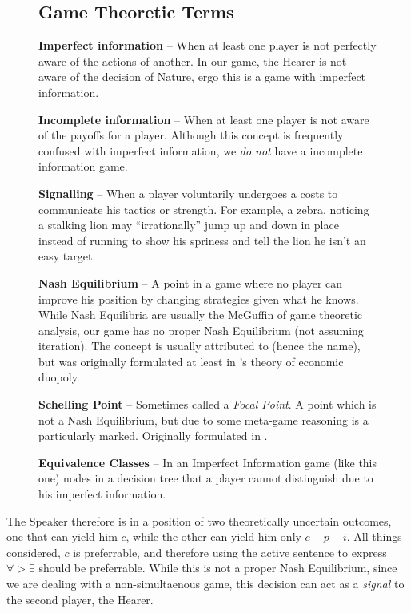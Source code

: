 \documentclass{article}
\begin{document}
\begin{figure}
\begin{shaded}
	\small
	\subsection*{Game Theoretic Terms}

	\textbf{Imperfect information} -- When at least one player is not perfectly aware of the actions of another. In our game, the Hearer is not aware of the decision of Nature, ergo this is a game with imperfect information.

	\textbf{Incomplete information} -- When at least one player is not aware of the payoffs for a player. Although this concept is frequently confused with imperfect information, we \emph{do not} have a incomplete information game.

	\textbf{Signalling} -- When a player voluntarily undergoes a costs to communicate his tactics or strength. For example, a zebra, noticing a stalking lion may ``irrationally'' jump up and down in place instead of running to show his spriness and tell the lion he isn't an easy target.

	\textbf{Nash Equilibrium} -- A point in a game where no player can improve his position by changing strategies given what he knows. While Nash Equilibria are usually the McGuffin of game theoretic analysis, our game has no proper Nash Equilibrium (not assuming iteration). The concept is usually attributed to \textcite{nash50} (hence the name), but was originally formulated at least in \textcite{cournot38}'s theory of economic duopoly.

	\textbf{Schelling Point} -- Sometimes called a \textit{Focal Point}. A point which is not a Nash Equilibrium, but due to some meta-game reasoning is a particularly marked. Originally formulated in \textcite{schelling60}.

	\textbf{Equivalence Classes} -- In an Imperfect Information game (like this one) nodes in a decision tree that a player cannot distinguish due to his imperfect information.
\end{shaded}
\end{figure}

The Speaker therefore is in a position of two theoretically uncertain outcomes, one that can yield him $c$, while the other can yield him only $c-p-i$.
All things considered, $c$ is preferrable, and therefore using the active sentence to express ${\forall}>{\exists}$ should be preferrable.
While this is not a proper Nash Equilibrium, since we are dealing with a non-simultaenous game, this decision can act as a \emph{signal} to the second player, the Hearer.
\end{document}
